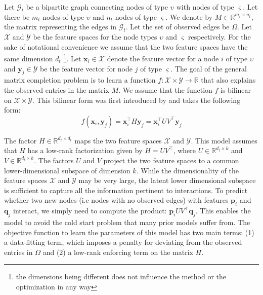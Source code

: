 \documentclass[runningheads,a4paper]{llncs}
\begin{document}
\label{MCintro}
Let $\mathcal{G}_{t}$ be a bipartite graph connecting nodes of type $\upsilon$ with nodes of type $\varsigma$. Let there be $m_t$ nodes of type $\upsilon$ and $n_t$ nodes of type $\varsigma$. We denote by $M \in \mathbb{R}^{m_t \times n_t}$, the matrix representing the edges in $\mathcal{G}_{t}$. Let the set of observed edges be $\Omega$. 
Let $\mathcal{X}$ and $\mathcal{Y}$ be the feature spaces for the node types $\upsilon$ and $\varsigma$ respectively. For the sake of notational convenience we assume that the two feature spaces have the same dimension $d_t$ \footnote{the dimensions being different does not influence the method or the optimization in any way}. Let $\mathbf{x}_i \in \mathcal{X}$ denote the feature vector for a node $i$ of type $\upsilon$ and $\mathbf{y}_j \in \mathcal{Y}$ be the feature vector for node $j$ of type $\varsigma$. The goal of the general matrix completion problem is to learn a function $f : \mathcal{X} \times \mathcal{Y} \rightarrow \mathbb{R}$ that also explains the observed entries in the matrix $M$. We assume that the function $f$ is bilinear on $\mathcal{X} \times \mathcal{Y}$. This bilinear form was first introduced by \cite{abernethy} and takes the following form:
\begin{equation}
f(\mathbf{x}_i, \mathbf{y}_j) = \mathbf{x}_i^\intercal H \mathbf{y}_j = \mathbf{x}_i^\intercal U V^\intercal \mathbf{y}_j
\end{equation}

The factor $H \in \mathbb{R}^{d_t \times d_t}$ maps the two feature spaces $\mathcal{X}$ and $\mathcal{Y}$. This model assumes that $H$ has a low-rank factorization given by $H = U V^\intercal$, where $U \in \mathbb{R}^{d_t \times k}$ and $V \in \mathbb{R}^{d_t \times k}$. The factors $U$ and $V$ project the two feature spaces to a common lower-dimensional subspace of dimension $k$. While the dimensionality of the feature spaces $\mathcal{X}$ and $\mathcal{Y}$ may be very large, the latent lower dimensional subspace is sufficient to capture all the information pertinent to interactions. To predict whether two new nodes (i.e nodes with no observed edges) with features $\mathbf{p}_i$ and $\mathbf{q}_j$ interact, we simply need to compute the product: $\mathbf{p}_i U V^\intercal \mathbf{q}_j$. This enables the model to avoid the cold start problem that many prior models suffer from. The objective function to learn the parameters of this model has two main terms: (1) a data-fitting term, which imposes a penalty for deviating from the observed entries in $\Omega$ and (2) a low-rank enforcing term on the matrix $H$. 
\end{document}

